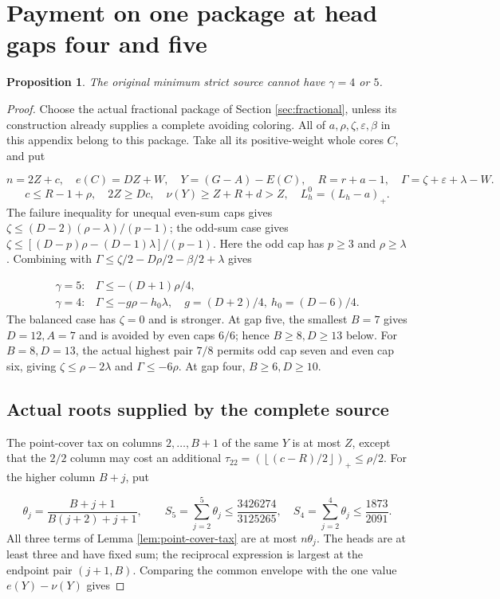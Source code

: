 \documentclass[11pt,a4paper]{article}
\newcommand{\floor}[1]{\left\lfloor#1\right\rfloor}
\newtheorem{proposition}[theorem]{Proposition}
\theoremstyle{definition}
\begin{document}
\section{Payment on one package at head gaps four and five}\label{app:gaps45}
\begin{proposition}\label{prop:gaps45}
The original minimum strict source cannot have $\gamma=4$ or $5$.
\end{proposition}
\begin{proof}
Choose the actual fractional package of Section \ref{sec:fractional},
unless its construction already supplies a complete avoiding coloring.
All of $a,\rho,\zeta,\varepsilon,\beta$ in this appendix belong to this package.
Take all its positive-weight whole cores $C$, and put

\[
n=2Z+c,\quad e(C)=DZ+W,\quad
Y=(G-A)-E(C),\quad R=r+a-1,\quad
\Gamma=\zeta+\varepsilon+\lambda-W.
\]
\[
c\le R-1+\rho,\quad 2Z\ge Dc,\quad
\nu(Y)\ge Z+R+d>Z,\quad L_h^0=(L_h-a)_+.
\]
The failure inequality for unequal even-sum caps gives
$\zeta\le(D-2)(\rho-\lambda)/(p-1)$;
the odd-sum case gives
$\zeta\le[(D-p)\rho-(D-1)\lambda]/(p-1)$.
Here the odd cap has $p\ge3$ and $\rho\ge\lambda$.
Combining with $\Gamma\le\zeta/2-D\rho/2-\beta/2+\lambda$ gives

\begin{equation}\label{eq:gap45-debt}
\begin{array}{ll}
\gamma=5:&\Gamma\le-(D+1)\rho/4,\\
\gamma=4:&\Gamma\le-g\rho-h_0\lambda,\quad
g=(D+2)/4,\ h_0=(D-6)/4.
\end{array}
\end{equation}
The balanced case has $\zeta=0$ and is stronger.
At gap five, the smallest $B=7$ gives $D=12,A=7$ and is avoided by even caps $6/6$;
hence $B\ge8,D\ge13$ below.
For $B=8,D=13$, the actual highest pair $7/8$ permits odd cap seven
and even cap six, giving $\zeta\le\rho-2\lambda$ and $\Gamma\le-6\rho$.
At gap four, $B\ge6,D\ge10$.

\subsection*{Actual roots supplied by the complete source}
The point-cover tax on columns $2,\ldots,B+1$ of the same $Y$
is at most $Z$, except that the $2/2$ column may cost an additional
$\tau_{22}=(\floor{(c-R)/2})_+\le\rho/2$.
For the higher column $B+j$, put

\[
\theta_j=\frac{B+j+1}{B(j+2)+j+1},\qquad
S_5=\sum_{j=2}^{5}\theta_j\le\frac{3426274}{3125265},
\quad
S_4=\sum_{j=2}^{4}\theta_j\le\frac{1873}{2091}.
\]
All three terms of Lemma \ref{lem:point-cover-tax} are at most $n\theta_j$.
The heads are at least three and have fixed sum; the reciprocal expression
is largest at the endpoint pair $(j+1,B)$.
Comparing the common envelope with the one value $e(Y)-\nu(Y)$ gives


\end{proof}
\end{document}
